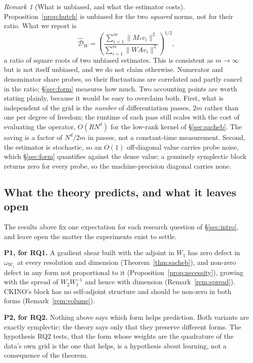 \documentclass[11pt]{article}
\theoremstyle{definition}
\theoremstyle{remark}
\newtheorem{remark}[theorem]{Remark}
\newcommand{\defect}{\mathcal{D}}
\newcommand{\ckino}{\textsc{CKINO}}
\begin{document}
\begin{remark}[What is unbiased, and what the estimator costs]
\label{rem:ratio}
Proposition~\ref{prop:hutch} is unbiased for the two \emph{squared} norms, not
for their ratio. What we report is
\begin{equation}
\widehat{\defect}_W
=\left(\frac{\sum_{i=1}^{m}\lVert M_\ast v_i\rVert^2}
            {\sum_{i=1}^{m}\lVert WAv_i\rVert^2}\right)^{1/2},
\label{eq:ratio-est}
\end{equation}
a ratio of square roots of two unbiased estimates. This is consistent as
$m\to\infty$ but is not itself unbiased, and we do not claim otherwise.
Numerator and denominator share probes, so their fluctuations are correlated
and partly cancel in the ratio; \S\ref{sec:form} measures how much. Two
accounting points are worth stating plainly, because it would be easy
to overclaim both. First, what is independent of the grid is the \emph{number}
of differentiation passes, $2m$ rather than one per degree of freedom; the
runtime of each pass still scales with the cost of evaluating the operator,
$O(RN^d)$ for the low-rank kernel of \S\ref{sec:sacheb}. The saving is a factor
of $N^d/2m$ in passes, not a constant-time measurement. Second, the estimator is
stochastic, so an $O(1)$ off-diagonal value carries probe noise, which
\S\ref{sec:form} quantifies against the dense value; a genuinely symplectic
block returns zero for every probe, so the machine-precision diagonal carries
none.
\end{remark}

\subsection{What the theory predicts, and what it leaves open}
\label{sec:predictions}

The results above fix one expectation for each research question of
\S\ref{sec:intro}, and leave open the matter the experiments exist to settle.

\textbf{P1, for RQ1.} A gradient shear built with the adjoint in $W_1$ has zero
defect in $\omega_{W_1}$ at every resolution and dimension
(Theorem~\ref{thm:sacheb}), and non-zero defect in any form not proportional to
it (Proposition~\ref{prop:necessity}), growing with the spread of $W_2W_1^{-1}$
and hence with dimension (Remark~\ref{rem:spread}). \ckino{}'s block has no
self-adjoint structure and should be non-zero in both forms
(Remark~\ref{rem:volume}).

\textbf{P2, for RQ2.} Nothing above says which form helps prediction. Both
variants are exactly symplectic; the theory says only that they preserve
different forms. The hypothesis RQ2 tests, that the form whose weights are the
quadrature of the data's own grid is the one that helps, is a hypothesis about
learning, not a consequence of the theorem.
\end{document}
